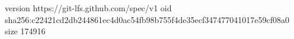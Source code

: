 version https://git-lfs.github.com/spec/v1
oid sha256:c22421cd2db244861ec4d0ac54fb98b755f4de35ecf347477041017e59cf08a0
size 174916
